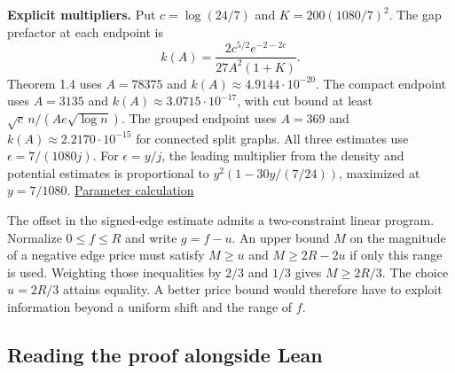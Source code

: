 \documentclass[english,11pt,a4paper]{article}
\begin{document}
\textbf{Explicit multipliers.} Put \(c=\log(24/7)\) and \(K=200(1080/7)^2\). The gap prefactor at each endpoint is \[k(A)=\frac{2c^{5/2}e^{-2-2c}}{27A^2(1+K)}.\] Theorem 1.4 uses \(A=78375\) and \(k(A)\approx4.9144\cdot10^{-20}\). The compact endpoint uses \(A=3135\) and \(k(A)\approx3.0715\cdot10^{-17}\), with cut bound at least \(\sqrt c\,n/(Ae\sqrt{\log n})\). The grouped endpoint uses \(A=369\) and \(k(A)\approx2.2170\cdot10^{-15}\) for connected split graphs. All three estimates use \(\epsilon=7/(1080j)\). For \(\epsilon=y/j\), the leading multiplier from the density and potential estimates is proportional to \(y^2(1-30y/(7/24))\), maximized at \(y=7/1080\). \href{https://github.com/jtraverso/split-clique-partition-gap/blob/ccb5444b2ecdff9de1d6221133633a25a224953d/R434/PolylogOrder.lean}{Parameter calculation}

The offset in the signed-edge estimate admits a two-constraint linear program. Normalize \(0\le f\le R\) and write \(g=f-u\). An upper bound \(M\) on the magnitude of a negative edge price must satisfy \(M\ge u\) and \(M\ge 2R-2u\) if only this range is used. Weighting those inequalities by \(2/3\) and \(1/3\) gives \(M\ge2R/3\). The choice \(u=2R/3\) attains equality. A better price bound would therefore have to exploit information beyond a uniform shift and the range of \(f\).

\subsection{Reading the proof alongside Lean}\label{reading-the-proof-alongside-lean}
\end{document}
